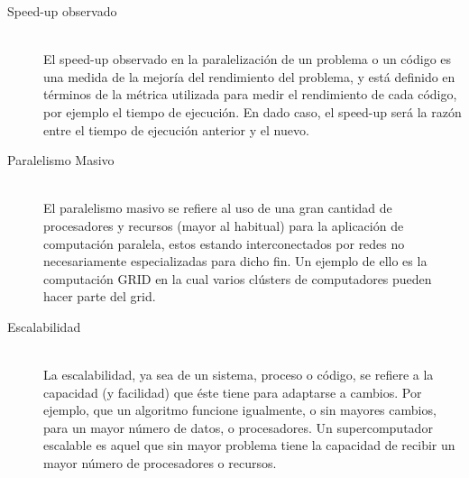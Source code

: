 \documentclass{article}
\begin{document}
\begin{description}
	\item[Speed-up observado] \hfill \\
	El speed-up observado en la paralelización de un problema o un código es una medida de la mejoría del rendimiento del problema, y está definido en términos de la métrica utilizada para medir el rendimiento de cada código, por ejemplo el tiempo de ejecución. En dado caso, el speed-up será la razón entre el tiempo de ejecución anterior y el nuevo.
	\item[Paralelismo Masivo] \hfill \\
	El paralelismo masivo se refiere al uso de una gran cantidad de procesadores y recursos (mayor al habitual) para la aplicación de computación paralela, estos estando interconectados por redes no necesariamente especializadas para dicho fin. Un ejemplo de ello es la computación GRID en la cual varios clústers de computadores pueden hacer parte del grid.
	\item[Escalabilidad] \hfill \\
	La escalabilidad, ya sea de un sistema, proceso o código, se refiere a la capacidad (y facilidad) que éste tiene para adaptarse a cambios. Por ejemplo, que un algoritmo funcione igualmente, o sin mayores cambios, para un mayor número de datos, o procesadores. Un supercomputador escalable es aquel que sin mayor problema tiene la capacidad de recibir un mayor número de procesadores o recursos.
	
\end{description}
\end{document}
